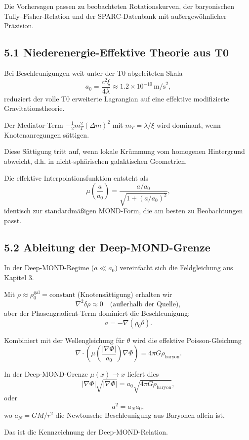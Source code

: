 	Die Vorhersagen passen zu beobachteten Rotationskurven, der baryonischen Tully–Fisher-Relation und der SPARC-Datenbank mit außergewöhnlicher Präzision.
	
	\subsection{5.1 Niederenergie-Effektive Theorie aus T0}
	
	Bei Beschleunigungen weit unter der T0-abgeleiteten Skala
	\[
	a_0 = \frac{c^2 \xi}{4 \lambda} \approx 1.2 \times 10^{-10} \, \text{m/s}^2,
	\]
	reduziert der volle T0 erweiterte Lagrangian auf eine effektive modifizierte Gravitationstheorie.
	
	Der Mediator-Term $-\frac{1}{2} m_T^2 (\Delta m)^2$ mit $m_T = \lambda / \xi$ wird dominant, wenn Knotenanregungen sättigen.
	
	Diese Sättigung tritt auf, wenn lokale Krümmung vom homogenen Hintergrund abweicht, d.h. in nicht-sphärischen galaktischen Geometrien.
	
	Die effektive Interpolationsfunktion entsteht als
	\[
	\mu\left(\frac{a}{a_0}\right) = \frac{a / a_0}{\sqrt{1 + (a / a_0)^2}},
	\]
	identisch zur standardmäßigen MOND-Form, die am besten zu Beobachtungen passt.
	
	\subsection{5.2 Ableitung der Deep-MOND-Grenze}
	
	In der Deep-MOND-Regime ($a \ll a_0$) vereinfacht sich die Feldgleichung aus Kapitel 3.
	
	Mit $\rho \approx \rho_0^{\text{gal}} = \text{constant}$ (Knotensättigung) erhalten wir
	\[
	\nabla^2 \delta \rho \approx 0 \quad \text{(außerhalb der Quelle)},
	\]
	aber der Phasengradient-Term dominiert die Beschleunigung:
	\[
	a = -\nabla (\rho_0 \theta).
	\]
	
	Kombiniert mit der Wellengleichung für $\theta$ wird die effektive Poisson-Gleichung
	\[
	\nabla \cdot \left( \mu\left(\frac{|\nabla \Phi|}{a_0}\right) \nabla \Phi \right) = 4\pi G \rho_{\text{baryon}}.
	\]
	
	In der Deep-MOND-Grenze $\mu(x) \to x$ liefert dies
	\[
	|\nabla \Phi| \sqrt{|\nabla \Phi|} = a_0 \sqrt{4\pi G \rho_{\text{baryon}}},
	\]
	oder
	\[
	a^2 = a_N a_0,
	\]
	wo $a_N = GM/r^2$ die Newtonsche Beschleunigung aus Baryonen allein ist.
	
	Das ist die Kennzeichnung der Deep-MOND-Relation.
	
